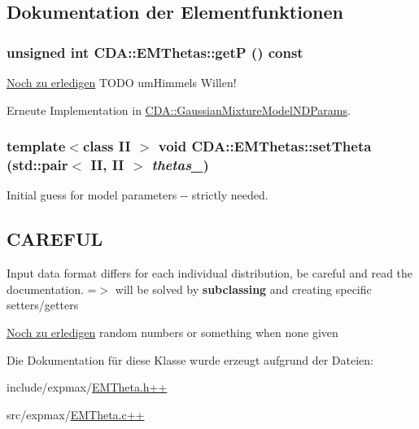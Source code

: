 \subsection{Dokumentation der Elementfunktionen}
\hypertarget{classCDA_1_1EMThetas_aeafa1d8926150ea06a4f76228817d38e}{
\subsubsection[{getP}]{\setlength{\rightskip}{0pt plus 5cm}unsigned int CDA::EMThetas::getP () const}}
\label{classCDA_1_1EMThetas_aeafa1d8926150ea06a4f76228817d38e}
\begin{Desc}
\item[\hyperlink{todo__todo000004}{Noch zu erledigen}]TODO umHimmels Willen! \end{Desc}


Erneute Implementation in \hyperlink{classCDA_1_1GaussianMixtureModelNDParams_a381c2e9b2f537dfb8558d202a9cb12ea}{CDA::GaussianMixtureModelNDParams}.

\hypertarget{classCDA_1_1EMThetas_a1c8058269e4d8a32a2dd58f13ad94369}{
\subsubsection[{setTheta}]{\setlength{\rightskip}{0pt plus 5cm}template$<$class II $>$ void CDA::EMThetas::setTheta (std::pair$<$ II, II $>$ {\em thetas\_\-})}}
\label{classCDA_1_1EMThetas_a1c8058269e4d8a32a2dd58f13ad94369}


Initial guess for model parameters -\/-\/ strictly needed. 

\hypertarget{classCDA_1_1EMThetas_CAREFUL}{}\subsection{CAREFUL}\label{classCDA_1_1EMThetas_CAREFUL}
Input data format differs for each individual distribution, be careful and read the documentation. =$>$ will be solved by {\bfseries subclassing} and creating specific setters/getters

\begin{Desc}
\item[\hyperlink{todo__todo000003}{Noch zu erledigen}]random numbers or something when none given \end{Desc}


Die Dokumentation für diese Klasse wurde erzeugt aufgrund der Dateien:\begin{DoxyCompactItemize}
\item 
include/expmax/\hyperlink{EMTheta_8h_09_09}{EMTheta.h++}\item 
src/expmax/\hyperlink{EMTheta_8c_09_09}{EMTheta.c++}\end{DoxyCompactItemize}
